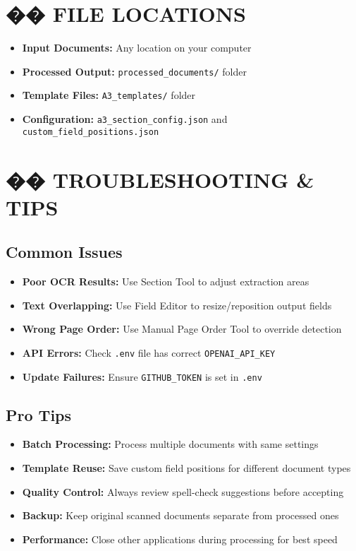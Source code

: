 \documentclass[11pt,a4paper]{article}
\begin{document}
\section*{�� FILE LOCATIONS}

\begin{itemize}[leftmargin=*,itemsep=0pt]
    \item \textbf{Input Documents:} Any location on your computer
    \item \textbf{Processed Output:} \texttt{processed\_documents/} folder
    \item \textbf{Template Files:} \texttt{A3\_templates/} folder
    \item \textbf{Configuration:} \texttt{a3\_section\_config.json} and \texttt{custom\_field\_positions.json}
\end{itemize}

\section*{�� TROUBLESHOOTING \& TIPS}

\subsection*{\faExclamationTriangle\space Common Issues}
\begin{itemize}[leftmargin=*,itemsep=0pt]
    \item \textbf{Poor OCR Results:} Use Section Tool to adjust extraction areas
    \item \textbf{Text Overlapping:} Use Field Editor to resize/reposition output fields  
    \item \textbf{Wrong Page Order:} Use Manual Page Order Tool to override detection
    \item \textbf{API Errors:} Check \texttt{.env} file has correct \texttt{OPENAI\_API\_KEY}
    \item \textbf{Update Failures:} Ensure \texttt{GITHUB\_TOKEN} is set in \texttt{.env}
\end{itemize}

\subsection*{\faLightbulb\space Pro Tips}
\begin{itemize}[leftmargin=*,itemsep=0pt]
    \item \textbf{Batch Processing:} Process multiple documents with same settings
    \item \textbf{Template Reuse:} Save custom field positions for different document types
    \item \textbf{Quality Control:} Always review spell-check suggestions before accepting
    \item \textbf{Backup:} Keep original scanned documents separate from processed ones
    \item \textbf{Performance:} Close other applications during processing for best speed
\end{itemize}
\end{document}
